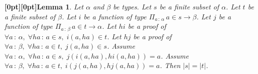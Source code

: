 \documentclass{article}
\makeatletter
\newcommand{\paperanchor}[1]{\hypertarget{#1}{}}%
\def\paperdest{\pdfextension dest}\def\paperstart{\pdfextension startlink}%
\def\paperend{\pdfextension endlink}\def\papercolor{\pdfextension colorstack}%
\let\paperdest\pdfdest\let\paperstart\pdfstartlink\let\paperend\pdfendlink\let\papercolor\pdfcolorstack
\newcommand{\paperanchor}[1]{\paperdest name{#1} xyz}%
\newcommand{\paperanchor}[1]{\special{pdf:dest (#1) [@thispage /XYZ null @ypos null]}}%
\newcommand{\paperlineanchor}[1]{\raisebox{10pt}[0pt][0pt]{\paperanchor{#1}}}
\DeclareRobustCommand{\paperresultname}[1]{\paperlineanchor{theorem:\arabic{theorem}}#1}
\theoremstyle{paperresult}
\newtheorem{lemma}[theorem]{\paperresultname{Lemma}}
\makeatother
\begin{document}
\begin{lemma}\label{theorem:68}
Let \(\alpha\) and \(\beta\) be types. Let \(s\) be a finite subset of \(\alpha\). Let \(t\) be a finite subset of \(\beta\). Let \(i\) be a function of type \(\Pi_{a\, :\, \alpha}\, a \in s \to \beta\). Let \(j\) be a function of type \(\Pi_{a\, :\, \beta}\, a \in t \to \alpha\). Let \(\mathit{hi}\) be a proof of \(\forall a\, :\, \alpha,\; \forall \mathit{ha}\, :\, a \in s,\; i\left(a, \mathit{ha}\right) \in t\). Let \(\mathit{hj}\) be a proof of \(\forall a\, :\, \beta,\; \forall \mathit{ha}\, :\, a \in t,\; j\left(a, \mathit{ha}\right) \in s\). Assume \(\forall a\, :\, \alpha,\; \forall \mathit{ha}\, :\, a \in s,\; j(i(a,\allowbreak{} \mathit{ha}),\allowbreak{} \mathit{hi}(a,\allowbreak{} \mathit{ha})) = a\). Assume \(\forall a\, :\, \beta,\; \forall \mathit{ha}\, :\, a \in t,\; i(j(a,\allowbreak{} \mathit{ha}),\allowbreak{} \mathit{hj}(a,\allowbreak{} \mathit{ha})) = a\). Then \(\left|s\right| = \left|t\right|\).
\end{lemma}
\end{document}

